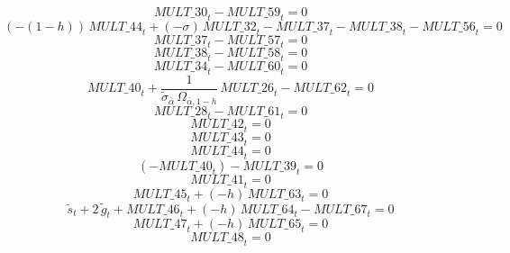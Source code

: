 \begin{dmath}
{MULT\_30}_{t}-{MULT\_59}_{t}=0
\end{dmath}
\begin{dmath}
\left(-\left(1-{{h}}\right)\right)\, {MULT\_44}_{t}+\left(-{{\sigma}}\right)\, {MULT\_32}_{t}-{MULT\_37}_{t}-{MULT\_38}_{t}-{MULT\_56}_{t}=0
\end{dmath}
\begin{dmath}
{MULT\_37}_{t}-{MULT\_57}_{t}=0
\end{dmath}
\begin{dmath}
{MULT\_38}_{t}-{MULT\_58}_{t}=0
\end{dmath}
\begin{dmath}
{MULT\_34}_{t}-{MULT\_60}_{t}=0
\end{dmath}
\begin{dmath}
{MULT\_40}_{t}+\frac{1}{{{\tilde\sigma_{\bar{\alpha}}}}\, {{\Omega_{\bar \alpha,1-h}}}}\, {MULT\_26}_{t}-{MULT\_62}_{t}=0
\end{dmath}
\begin{dmath}
{MULT\_28}_{t}-{MULT\_61}_{t}=0
\end{dmath}
\begin{dmath}
{MULT\_42}_{t}=0
\end{dmath}
\begin{dmath}
{MULT\_43}_{t}=0
\end{dmath}
\begin{dmath}
{MULT\_44}_{t}=0
\end{dmath}
\begin{dmath}
\left(-{MULT\_40}_{t}\right)-{MULT\_39}_{t}=0
\end{dmath}
\begin{dmath}
{MULT\_41}_{t}=0
\end{dmath}
\begin{dmath}
{MULT\_45}_{t}+\left(-{{h}}\right)\, {MULT\_63}_{t}=0
\end{dmath}
\begin{dmath}
{{\tilde s}}_{t}+2\, {{\tilde g}}_{t}+{MULT\_46}_{t}+\left(-{{h}}\right)\, {MULT\_64}_{t}-{MULT\_67}_{t}=0
\end{dmath}
\begin{dmath}
{MULT\_47}_{t}+\left(-{{h}}\right)\, {MULT\_65}_{t}=0
\end{dmath}
\begin{dmath}
{MULT\_48}_{t}=0
\end{dmath}
